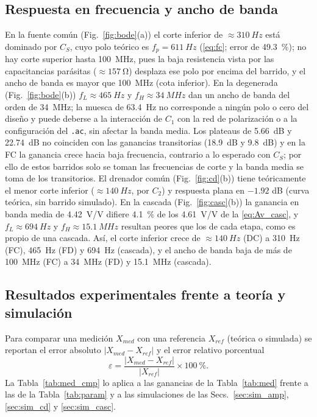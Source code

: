 \documentclass[conference]{IEEEtran}
\begin{document}
\subsection{Respuesta en frecuencia y ancho de banda}
\label{sec:an_bode}
En la fuente común (Fig.~\ref{fig:bode}(a)) el corte inferior de $\approx\SI{310}{Hz}$ está dominado por $C_S$, cuyo polo teórico es $f_p=\SI{611}{Hz}$ (\eqref{eq:fc}; error de \SI{49.3}{\percent}); no hay corte superior hasta \SI{100}{MHz}, pues la baja resistencia vista por las capacitancias parásitas ($\approx\SI{157}{\ohm}$) desplaza ese polo por encima del barrido, y el ancho de banda es mayor que \SI{100}{MHz} (cota inferior). En la degenerada (Fig.~\ref{fig:bode}(b)) $f_L\approx\SI{465}{Hz}$ y $f_H\approx\SI{34}{MHz}$ dan un ancho de banda del orden de \SI{34}{MHz}; la muesca de \SI{63.4}{Hz} no corresponde a ningún polo o cero del diseño y puede deberse a la interacción de $C_1$ con la red de polarización o a la configuración del \texttt{.ac}, sin afectar la banda media. Los plateaus de \SI{5.66}{dB} y \SI{22.74}{dB} no coinciden con las ganancias transitorias (\SI{18.9}{dB} y \SI{9.8}{dB}) y en la FC la ganancia crece hacia baja frecuencia, contrario a lo esperado con $C_S$; por ello de estos barridos solo se toman las frecuencias de corte y la banda media se toma de los transitorios. El drenador común (Fig.~\ref{fig:cd}(b)) tiene teóricamente el menor corte inferior ($\approx\SI{140}{Hz}$, por $C_2$) y respuesta plana en $-1.92$ dB (curva teórica, sin barrido simulado). En la cascada (Fig.~\ref{fig:casc}(b)) la ganancia en banda media de \SI{4.42}{V/V} difiere \SI{4.1}{\percent} de los \SI{4.61}{V/V} de la \eqref{eq:Av_casc}, y $f_L\approx\SI{694}{Hz}$ y $f_H\approx\SI{15.1}{MHz}$ resultan peores que los de cada etapa, como es propio de una cascada. Así, el corte inferior crece de $\approx\SI{140}{Hz}$ (DC) a \SI{310}{Hz} (FC), \SI{465}{Hz} (FD) y \SI{694}{Hz} (cascada), y el ancho de banda baja de más de \SI{100}{MHz} (FC) a \SI{34}{MHz} (FD) y \SI{15.1}{MHz} (cascada).

\subsection{Resultados experimentales frente a teoría y simulación}
\label{sec:an_med}
Para comparar una medición $X_{med}$ con una referencia $X_{ref}$ (teórica o simulada) se reportan el error absoluto $|X_{med}-X_{ref}|$ y el error relativo porcentual
\begin{equation}
\varepsilon=\frac{|X_{med}-X_{ref}|}{|X_{ref}|}\times\SI{100}{\percent}.
\label{eq:err}
\end{equation}
La Tabla~\ref{tab:med_cmp} lo aplica a las ganancias de la Tabla~\ref{tab:med} frente a las de la Tabla~\ref{tab:param} y a las simulaciones de las Secs.~\ref{sec:sim_amp}, \ref{sec:sim_cd} y \ref{sec:sim_casc}.
\end{document}
